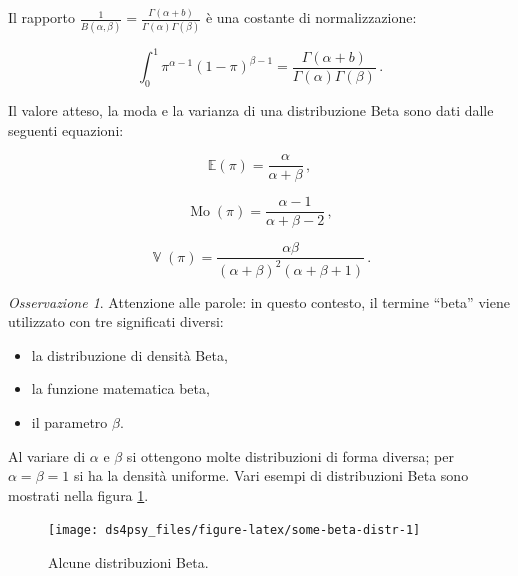 \documentclass[
  11pt,
]{krantz}
\newcommand{\E}{\mathbb{E}} %
\DeclareMathOperator{\Var}{\mathbb{V}} %
\DeclareMathOperator{\Mo}{Mo} %
\theoremstyle{definition}
\theoremstyle{definition}
\theoremstyle{definition}
\theoremstyle{definition}
\theoremstyle{remark}
\newtheorem*{remark}{Osservazione}
\begin{document}
Il rapporto \(\frac{1}{B(\alpha, \beta)} = \frac{\Gamma(\alpha+b)}{\Gamma(\alpha)\Gamma(\beta)}\) è una costante di normalizzazione:

\begin{equation}
\int_0^1 \pi^{\alpha-1} (1-\pi)^{\beta-1} = \frac{\Gamma(\alpha+b)}{\Gamma(\alpha)\Gamma(\beta)}\,.
\end{equation}

Il valore atteso, la moda e la varianza di una distribuzione Beta sono dati dalle seguenti equazioni:

\begin{equation}
\E(\pi) = \frac{\alpha}{\alpha+\beta}\,,
\label{eq:beta-mean}
\end{equation}

\begin{equation}
\Mo(\pi) = \frac{\alpha-1}{\alpha+\beta-2}\,,
\label{eq:beta-mode}
\end{equation}

\begin{equation}
\Var(\pi) = \frac{\alpha \beta}{(\alpha+\beta)^2 (\alpha+\beta+1)}\,.
\label{eq:beta-var}
\end{equation}

\begin{remark}

Attenzione alle parole: in questo contesto, il termine ``beta'' viene utilizzato con tre significati diversi:

\begin{itemize}
\item
  la distribuzione di densità Beta,
\item
  la funzione matematica beta,
\item
  il parametro \(\beta\).
\end{itemize}

\end{remark}

Al variare di \(\alpha\) e \(\beta\) si ottengono molte distribuzioni di forma diversa; per \(\alpha = \beta = 1\) si ha la densità uniforme. Vari esempi di distribuzioni Beta sono mostrati nella figura \ref{fig:some-beta-distr}.

\begin{figure}[h]

{\centering \texttt{[image: ds4psy\_files/figure-latex/some-beta-distr-1]} 

}

\caption{Alcune distribuzioni Beta.}\label{fig:some-beta-distr}
\end{figure}
\end{document}
